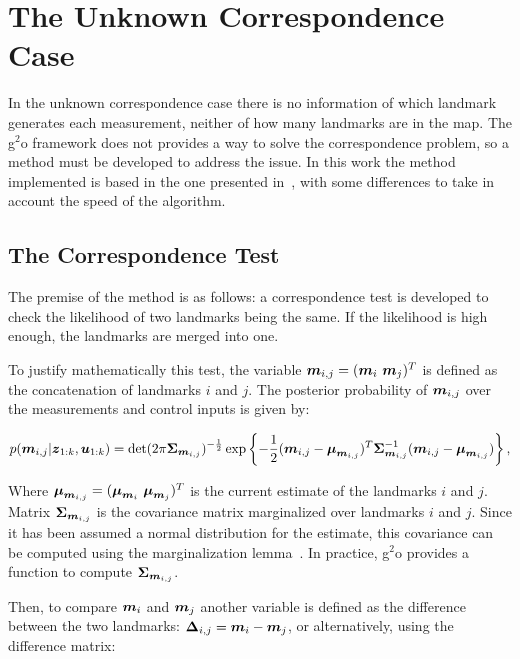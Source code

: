\section{The Unknown Correspondence Case}

In the unknown correspondence case there is no information of which landmark generates each measurement, neither of how many landmarks are in the map. The g$^2$o framework does not provides a way to solve the correspondence problem, so a method must be developed to address the issue. In this work the method implemented is based in the one presented in~\cite{graphslam}, with some differences to take in account the speed of the algorithm. 

\subsection{The Correspondence Test}

The premise of the method is as follows: a correspondence test is developed to check the likelihood of two landmarks being the same. If the likelihood is high enough, the landmarks are merged into one. 

To justify mathematically this test, the variable $\boldsymbol{m}_{i,j}=(\boldsymbol{m}_i~ \boldsymbol{m}_j)^T$ is defined as the concatenation of landmarks $i$ and $j$. The posterior probability of $\boldsymbol{m}_{i,j}$ over the measurements and control inputs is given by:

\begin{equation}
p(\boldsymbol{m}_{i,j}|\boldsymbol{z}_{1:k},\boldsymbol{u}_{1:k})=
\det(2\pi\boldsymbol{\Sigma}_{\boldsymbol{m}_{i,j}})^{-\frac{1}{2}}\exp\left\lbrace -\frac{1}{2}(\boldsymbol{m}_{i,j}-\boldsymbol{\mu}_{\boldsymbol{m}_{i,j}})^T
\boldsymbol{\Sigma}_{\boldsymbol{m}_{i,j}}^{-1}(\boldsymbol{m}_{i,j}-\boldsymbol{\mu}_{\boldsymbol{m}_{i,j}})\right\rbrace,
\label{eq:concatenate}
\end{equation}

\noindent
Where $\boldsymbol{\mu}_{\boldsymbol{m}_{i,j}}=(\boldsymbol{\mu}_{\boldsymbol{m}_i}~ \boldsymbol{\mu}_{\boldsymbol{m}_j})^T$ is the current estimate of the landmarks $i$ and $j$. Matrix $\boldsymbol{\Sigma}_{\boldsymbol{m}_{i,j}}$ is the covariance matrix marginalized over landmarks $i$ and $j$. Since it has been assumed a normal distribution for the estimate, this covariance can be computed using the marginalization lemma~\cite{graphslam}. In practice, g$^2$o provides a function to compute $\boldsymbol{\Sigma}_{\boldsymbol{m}_{i,j}}$.

Then, to compare $\boldsymbol{m}_i$ and $\boldsymbol{m}_j$ another variable is defined as the difference between the two landmarks: $\boldsymbol{\Delta}_{i,j}=\boldsymbol{m}_i-\boldsymbol{m}_j$, or alternatively, using the difference matrix:

